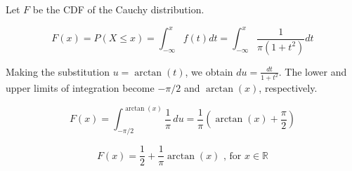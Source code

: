 Let $F$ be the CDF of the Cauchy distribution.

$$
F(x) = P(X \le x) = \int_{-\infty}^x f(t) dt = \int_{-\infty}^x \frac{1}{\pi(1+t^2)} dt
$$

Making the substitution $u = \arctan(t)$, we obtain $du = \frac{dt}{1+t^2}$.
The lower and upper limits of integration become $-\pi/2$ and $\arctan(x)$, respectively.

$$
F(x) = \int_{-\pi/2}^{\arctan(x)} \frac{1}{\pi} \, du = \frac{1}{\pi} \left( \arctan(x) + \frac{\pi}{2} \right)
$$

$$
F(x) = \frac{1}{2} + \frac{1}{\pi} \arctan(x) \text{ , for } x \in \mathbb{R}
$$

